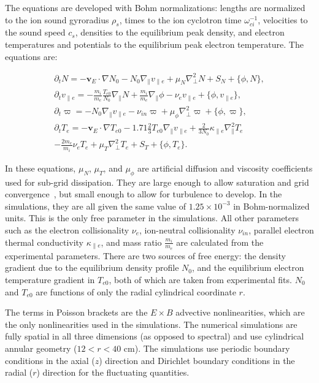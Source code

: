 \documentclass[showpacs,preprintnumbers,amsmath,amssymb,superscriptaddress]{revtex4}
\def\beqar{\begin{eqnarray}}
\def\eeqar{\end{eqnarray}}
\newcommand{\pdt}{\partial_t}
\def\grad{\nabla}
\newcommand{\gradpar}{\grad_\parallel}
\newcommand{\gradperp}{\grad_\perp}
\newcommand{\vpe}{v_{\parallel e}}
\newcommand{\nue}{\nu_{e}}
\newcommand{\nuin}{\nu_{in}}
\newcommand{\kpe}{\kappa_{\parallel e}}
\newcommand{\fmie}{\frac{m_i}{m_e}}
\begin{document}
The equations are developed with Bohm normalizations: lengths are
normalized to the ion sound gyroradius $\rho_s$, times to the ion
cyclotron time $\omega_{ci}^{-1}$, velocities to the sound speed $c_s$, densities to the equilibrium peak density, and electron
temperatures and potentials to the equilibrium peak electron temperature. The equations are:

\beqar
\label{ni_eq}
\pdt N = - {\mathbf v_E} \cdot \grad N_0 - N_0 \gradpar \vpe + \mu_N \gradperp^2 N + S_N + \{\phi,N\}, \\
\label{ve_eq}
\pdt \vpe = - \fmie \frac{T_{e0}}{N_0} \gradpar N + \fmie \gradpar \phi - \nue \vpe + \{\phi,\vpe \}, \\
\label{rho_eq}
\pdt \varpi = - N_0 \gradpar \vpe  - \nuin \varpi + \mu_\phi \gradperp^2 \varpi + \{\phi,\varpi \}, \\
\label{te_eq}
\pdt T_e = - {\mathbf v_E} \cdot \grad T_{e0} - 1.71 \frac{2}{3} T_{e0} \gradpar \vpe + \frac{2}{3 N_0} \kpe \gradpar^2 T_e  \nonumber \\
- \frac{2 m_e}{m_i} \nue T_e  + \mu_T \gradperp^2 T_e +  S_T + \{\phi,T_e\}.
\eeqar

In these equations, $\mu_N$, $\mu_T$, and $\mu_\phi$ are artificial diffusion and viscosity coefficients used for sub-grid dissipation. They are large enough to allow saturation
and grid convergence~\cite{friedman2012}, but small enough to allow for turbulence to develop. In the simulations, they are all given the same value of $1.25 \times 10^{-3}$ in Bohm-normalized units. 
This is the only free parameter in the simulations. All other parameters such as the electron collisionality $\nue$, ion-neutral
collisionality $\nuin$, parallel electron thermal conductivity $\kpe$, and mass ratio $\fmie$ are calculated from the experimental parameters.
There are two sources of free energy: the density gradient due to the equilibrium density profile $N_0$, and the equilibrium electron temperature gradient in $T_{e0}$, both of which are
taken from experimental fits. $N_0$ and $T_{e0}$ are functions of only the radial cylindrical coordinate $r$. 

The terms in Poisson brackets are the $E \times B$ advective nonlinearities, which are the only nonlinearities used in the simulations.
The numerical simulations are fully spatial in all three dimensions (as opposed to spectral) and use cylindrical annular geometry ($12<r<40$ cm).
The simulations use periodic boundary conditions in the axial ($z$) direction and Dirichlet boundary
conditions in the radial ($r$) direction for the fluctuating quantities. 
\end{document}
